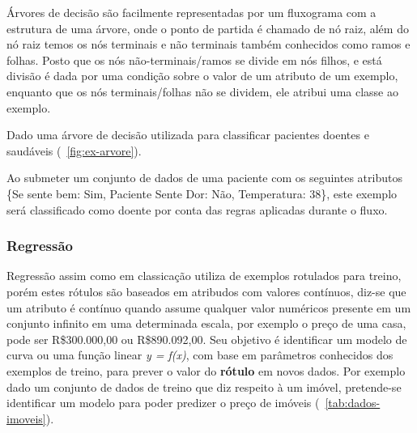 Árvores de decisão são facilmente representadas por um fluxograma com a estrutura de uma árvore, onde o ponto de partida é chamado de nó raiz,
além do nó raiz temos os nós terminais e não terminais também conhecidos como ramos e folhas. Posto que os nós não-terminais/ramos se divide em nós filhos,
e está divisão é dada por uma condição sobre o valor de um atributo de um exemplo, enquanto que os nós terminais/folhas não se dividem, ele atribui uma classe ao exemplo.

Dado uma árvore de decisão utilizada para classificar pacientes doentes e saudáveis (~\autoref{fig:ex-arvore}).

\begin{figure}[ht!]
	\centering
\end{figure}

Ao submeter um conjunto de dados de uma paciente com os seguintes atributos \{Se sente bem: Sim, Paciente Sente Dor: Não, Temperatura: 38\}, 
este exemplo será classificado como doente por conta das regras aplicadas durante o fluxo.

\subsubsection{Regressão}
\label{subsubsec{regressao}}
Regressão assim como em classicação utiliza de exemplos rotulados para treino, porém estes rótulos são baseados em atribudos com valores contínuos, 
diz-se que um atributo é contínuo quando assume qualquer valor numéricos presente em um conjunto infinito em uma determinada escala, por exemplo o preço de uma casa, 
pode ser R\$300.000,00 ou R\$890.092,00. Seu objetivo é identificar um modelo de curva ou uma função linear \textit{y = f(x)}, com base
em parâmetros conhecidos dos exemplos de treino, para prever o valor do \textbf{rótulo} em novos dados.
Por exemplo dado um conjunto de dados de treino que diz respeito à um imóvel, pretende-se identificar um modelo para poder predizer
o preço de imóveis (~\autoref{tab:dados-imoveis}).

